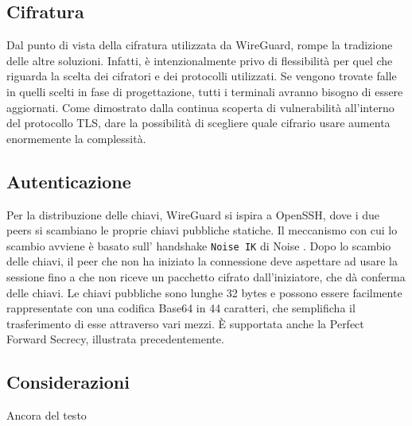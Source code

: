 \subsection{Cifratura}
Dal punto di vista della cifratura utilizzata da WireGuard, rompe la tradizione delle altre soluzioni. Infatti, è intenzionalmente privo di flessibilità per quel che riguarda la scelta dei cifratori e dei protocolli utilizzati. Se vengono trovate falle in quelli scelti in fase di progettazione, tutti i terminali avranno bisogno di essere aggiornati. Come dimostrato dalla continua scoperta di vulnerabilità all'interno del protocollo TLS, dare la possibilità di scegliere quale cifrario usare aumenta enormemente la complessità.

\subsection{Autenticazione}
Per la distribuzione delle chiavi, WireGuard si ispira a OpenSSH, dove i due peers si scambiano le proprie chiavi pubbliche statiche. Il meccanismo con cui lo scambio avviene è basato sull' handshake \texttt{Noise IK} di Noise \cite{Noise}. Dopo lo scambio delle chiavi, il peer che non ha iniziato la connessione deve aspettare ad usare la sessione fino a che non riceve un pacchetto cifrato dall'iniziatore, che dà conferma delle chiavi.
Le chiavi pubbliche sono lunghe 32 bytes e possono essere facilmente rappresentate con una codifica Base64 in 44 caratteri, che semplificha il trasferimento di esse attraverso vari mezzi. È supportata anche la Perfect Forward Secrecy, illustrata precedentemente.

\subsection{Considerazioni}
Ancora del testo
